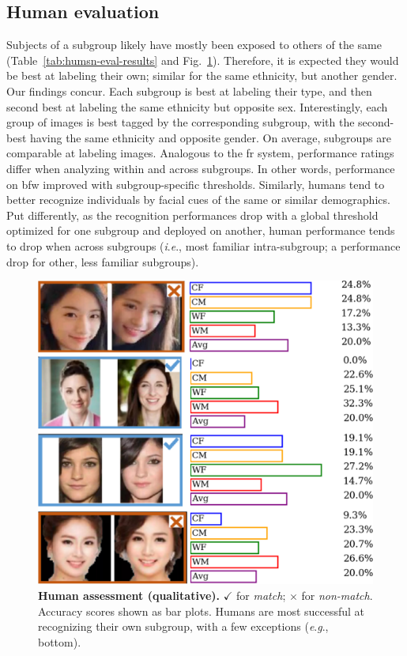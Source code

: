\documentclass[10pt,twocolumn,letterpaper]{article}
\newcommand{\ie}{\textit{i}.\textit{e}., }
\newcommand{\eg}{\textit{e}.\textit{g}., }
\begin{document}
\subsection{Human evaluation}
Subjects of a subgroup likely have mostly been exposed to others of the same (Table~\ref{tab:humsn-eval-results} and Fig.~\ref{fig:human-eval}). Therefore, it is expected they would be best at labeling their own; similar for the same ethnicity, but another gender. Our findings concur. Each subgroup is best at labeling their type, and then second best at labeling the same ethnicity but opposite sex. Interestingly, each group of images is best tagged by the corresponding subgroup, with the second-best having the same ethnicity and opposite gender. On average, subgroups are comparable at labeling images. Analogous to the \gls{fr} system, performance ratings differ when analyzing within and across subgroups. In other words, performance on \gls{bfw} improved with subgroup-specific thresholds. Similarly, humans tend to better recognize individuals by facial cues of the same or similar demographics. Put differently, as the recognition performances drop with a global threshold optimized for one subgroup and deployed on another, human performance tends to drop when across subgroups (\ie most familiar intra-subgroup; a performance drop for other, less familiar subgroups).
 

\begin{figure}[t!] 
	\centering    
	\includegraphics[width=.69\linewidth] {figures/human_eval.pdf}
		\caption{\small{\textbf{Human assessment (qualitative).} $\checkmark$ for \emph{match}; $\times$ for \emph{non-match}. Accuracy scores shown as bar plots. Humans are most successful at recognizing their own subgroup, with a few exceptions (\eg bottom).}}
		\label{fig:human-eval} 
\end{figure} 
\end{document}
